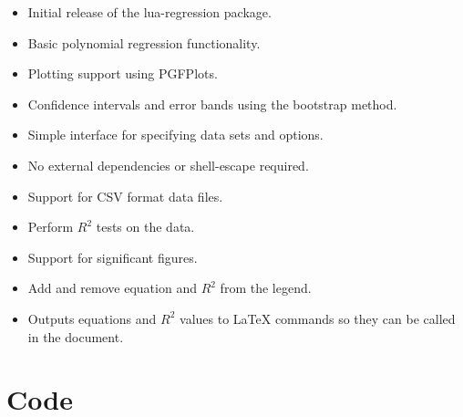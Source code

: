 \documentclass[11pt]{article}
\begin{document}
    \begin{itemize}
        \item Initial release of the {\ttfamily lua-regression} package.
        \item Basic polynomial regression functionality.
        \item Plotting support using PGFPlots.
        \item Confidence intervals and error bands using the bootstrap method.
        \item Simple interface for specifying data sets and options.
        \item No external dependencies or {\ttfamily shell-escape} required.
        \item Support for CSV format data files.
        \item Perform $R^2$ tests on the data.
        \item Support for significant figures.
        \item Add and remove equation and $R^2$ from the legend.
        \item Outputs equations and $R^2$ values to LaTeX commands so they can be called in the document.
    \end{itemize}

    \pagebreak

    \section{Code}

    \inputminted[autogobble, breaklines, breakanywhere, firstline=22, linenos]{latex}{lua-regression.dat}
\end{document}
